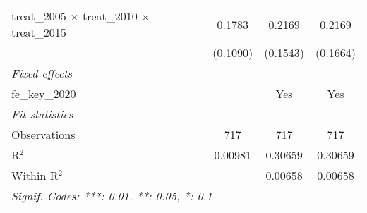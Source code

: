 \begin{table}[htbp]
\begin{tabular}{lccc}
      treat\_2005 $\times$ treat\_2010 $\times$ treat\_2015      & 0.1783         & 0.2169   & 0.2169\\   
                                                                 & (0.1090)       & (0.1543) & (0.1664)\\   
      \midrule
      \emph{Fixed-effects}\\
      fe\_key\_2020                                              &                & Yes      & Yes\\  
      \midrule
      \emph{Fit statistics}\\
      Observations                                               & 717            & 717      & 717\\  
      R$^2$                                                      & 0.00981        & 0.30659  & 0.30659\\  
      Within R$^2$                                               &                & 0.00658  & 0.00658\\  
      \midrule \midrule
      \multicolumn{4}{l}{\emph{Signif. Codes: ***: 0.01, **: 0.05, *: 0.1}}\\
   \end{tabular}
\end{table}


